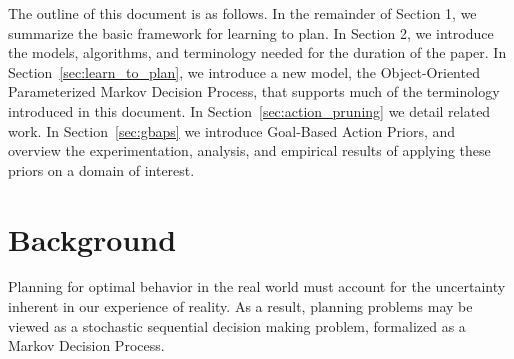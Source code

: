 \documentclass[11pt]{article}
\begin{document}
The outline of this document is as follows. In the remainder of Section 1, we summarize the basic framework for learning to plan. In Section 2, we introduce the models, algorithms, and terminology needed for the duration of the paper. In Section~\ref{sec:learn_to_plan}, we introduce a new model, the Object-Oriented Parameterized Markov Decision Process, that supports much of the terminology introduced in this document. In Section~\ref{sec:action_pruning} we detail related work. In Section~\ref{sec:gbaps} we introduce Goal-Based Action Priors, and overview the experimentation, analysis, and empirical results of applying these priors on a domain of interest.


\section{Background}
\label{sec:background}

%
%
%
%
%

Planning for optimal behavior in the real world must account for the uncertainty inherent in our experience of reality. As a result, planning problems may be viewed as a stochastic sequential decision making problem, formalized as a Markov Decision Process.

\end{document}
